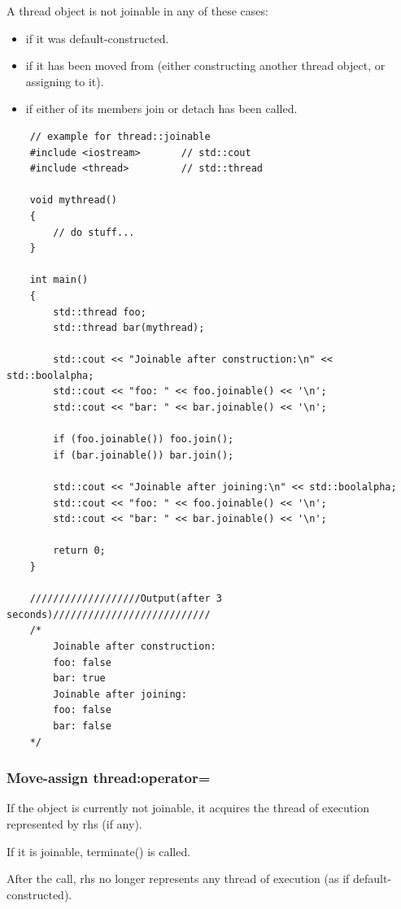 \documentclass[UTF8,a4paper,12pt]{ctexbook}
\begin{document}
		A thread object is not joinable in any of these cases:
		\begin{itemize}[itemindent = 1em]
			\item if it was default-constructed.
			\item if it has been moved from (either constructing another thread object, or assigning to it).
			\item if either of its members join or detach has been called.
		\end{itemize}
\begin{lstlisting}
	// example for thread::joinable
	#include <iostream>       // std::cout
	#include <thread>         // std::thread
	
	void mythread() 
	{
		// do stuff...
	}
	
	int main() 
	{
		std::thread foo;
		std::thread bar(mythread);
		
		std::cout << "Joinable after construction:\n" << std::boolalpha;
		std::cout << "foo: " << foo.joinable() << '\n';
		std::cout << "bar: " << bar.joinable() << '\n';
		
		if (foo.joinable()) foo.join();
		if (bar.joinable()) bar.join();
		
		std::cout << "Joinable after joining:\n" << std::boolalpha;
		std::cout << "foo: " << foo.joinable() << '\n';
		std::cout << "bar: " << bar.joinable() << '\n';
		
		return 0;
	}
	
	///////////////////Output(after 3 seconds)///////////////////////////
	/*
		Joinable after construction:
		foo: false
		bar: true
		Joinable after joining:
		foo: false
		bar: false
	*/
\end{lstlisting}
		\subsubsection{Move-assign thread:operator=}If the object is currently not joinable, it acquires the thread of execution represented by rhs (if any).
		
		If it is joinable, terminate() is called.
		
		After the call, rhs no longer represents any thread of execution (as if default-constructed).
		
\end{document}
